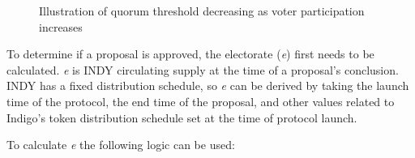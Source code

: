 \documentclass{article}
\begin{document}
\begin{sloppypar}
\hypertarget{quorum-threshold}{%
\begin{figure}[htbp]
\centering

\caption{Illustration of quorum threshold decreasing as voter
participation increases}
\end{figure}}

\filbreak

To determine if a proposal is approved, the electorate (\emph{e}) first
needs to be calculated. \emph{e} is INDY circulating supply at the time
of a proposal's conclusion. INDY has a fixed distribution schedule, so
\emph{e} can be derived by taking the launch time of the protocol, the
end time of the proposal, and other values related to Indigo's token
distribution schedule set at the time of protocol launch.

To calculate \emph{e} the following logic can be used:


\end{sloppypar}
\end{document}
